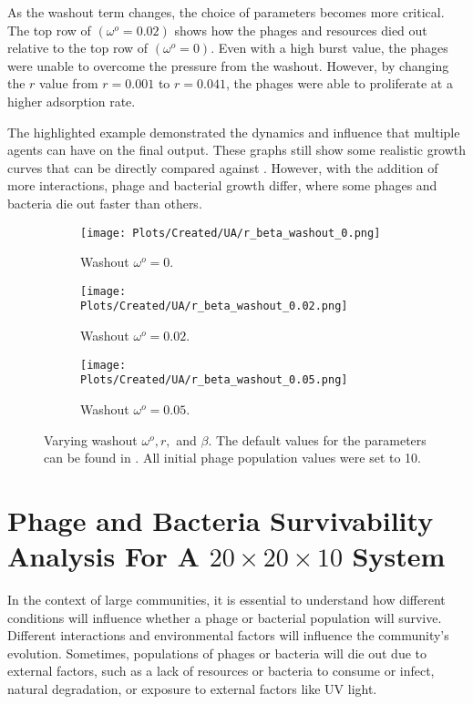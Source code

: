 As the washout term changes, the choice of parameters becomes more critical. 
The top row of  $(\omega^o = 0.02)$ shows how the phages and resources died out relative to the top row of  $(\omega^o = 0)$. 
Even with a high burst value, the phages were unable to overcome the pressure from the washout. 
However, by changing the $r$ value from $r=0.001$ to $r=0.041$, the phages were able to proliferate at a higher adsorption rate. 

The highlighted example demonstrated the dynamics and influence that multiple agents can have on the final output. 
These graphs still show some realistic growth curves that can be directly compared against . 
However, with the addition of more interactions, phage and bacterial growth differ, where some phages and bacteria die out faster than others. 

\begin{figure}[]
    \centering
    \begin{subfigure}{0.49\linewidth}
        \centering
        \texttt{[image: Plots/Created/UA/r\_beta\_washout\_0.png]}
        \caption{
            Washout $\omega^o=0$. 
        }
        \label{fig:created:r_beta_washout_0}
    \end{subfigure}
    \hfill
    \begin{subfigure}{0.49\linewidth}
        \centering
        \texttt{[image: Plots/Created/UA/r\_beta\_washout\_0.02.png]}
        \caption{
            Washout $\omega^o=0.02$. 
        }
        \label{fig:created:r_beta_washout_0.02}
    \end{subfigure}
    \begin{subfigure}{0.49\linewidth}
        \centering
        \texttt{[image: Plots/Created/UA/r\_beta\_washout\_0.05.png]}
        \caption{
            Washout $\omega^o=0.05$. 
        }
        \label{fig:created:r_beta_washout_0.05}
    \end{subfigure}
    \caption{
        Varying washout $\omega^o, r,$ and $\beta$. 
        The default values for the parameters can be found in . 
        All initial phage population values were set to 10. 
    }
\end{figure}

\section{Phage and Bacteria Survivability Analysis For A $20\times20\times10$ System}
In the context of large communities, it is essential to understand how different conditions will influence whether a phage or bacterial population will survive. 
Different interactions and environmental factors will influence the community's evolution. 
Sometimes, populations of phages or bacteria will die out due to external factors, such as a lack of resources or bacteria to consume or infect, natural degradation, or exposure to external factors like UV light. 

